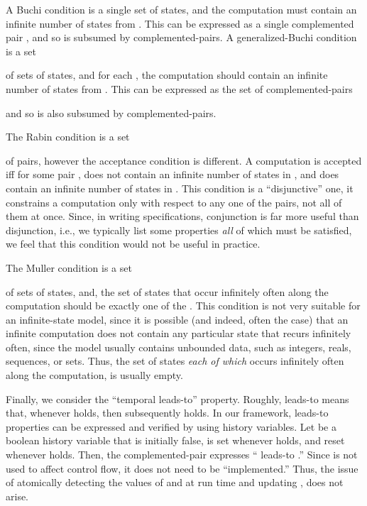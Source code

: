 \documentclass[11pt]{article}
\begin{document}
A Buchi condition is a single set  of states, and the
computation must contain an infinite number of states from .
This can be expressed as a single complemented
pair , and so is subsumed by complemented-pairs.
A generalized-Buchi condition  is a set 
 
of sets of states, and for each , the computation should
contain an infinite number of states from .
This can be expressed as the set of complemented-pairs

and so is also subsumed by complemented-pairs.

The Rabin condition is a set 

of pairs, however the acceptance condition is different.
A computation  is accepted iff for some pair
, 
 does not contain an infinite number of states in , and
 does contain an infinite number of states in .
This condition is a ``disjunctive'' one, it constrains a computation
only with respect to any one of the pairs, not all of them at once.
Since, in writing specifications, conjunction is far more useful than
disjunction, i.e., we typically list some properties \emph{all} of which
must be satisfied, we feel that this condition would not be useful in
practice.

The Muller condition is a set 

of sets of states, and, the set of states that
occur infinitely often along the computation should be exactly one of
the . This condition is not very suitable for an
infinite-state model, since it is possible (and indeed, often the
case) that an infinite computation does not contain any particular state
that recurs infinitely often, since the model usually contains
unbounded data, such as integers, reals, sequences, or sets.
Thus, the set of states \emph{each of which} 
occurs infinitely often along the computation, is usually empty.



Finally, we consider the ``temporal leads-to'' property.  Roughly, 
leads-to  means that, whenever  holds, then  subsequently 
holds. In our framework, leads-to properties can be expressed and
verified by using history variables. 
Let  be a boolean history variable that is initially false,
is set whenever  holds, and reset whenever  holds.
Then, the complemented-pair  expresses `` leads-to .''
Since  is not used to affect control flow, it
does not need to be ``implemented.'' Thus, the issue of
atomically detecting the values of  and  at run time and updating
, does not arise.
\end{document}
